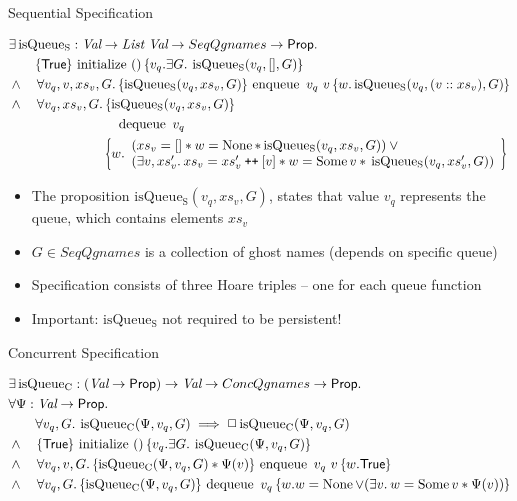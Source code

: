 \documentclass[9pt]{beamer}
\newcommand{\initialise}{\operatorname{initialize}}
\newcommand{\enqueue}{\operatorname{enqueue}}
\newcommand{\dequeue}{\operatorname{dequeue}}
\newcommand{\isqueueseq}{\operatorname{isQueue_{S}}}
\newcommand{\isqueueconc}{\operatorname{isQueue_{C}}}
\newcommand{\SeqQgnames}{SeqQgnames}
\newcommand{\ConcQgnames}{ConcQgnames}
\newcommand{\vq}{v_q}
\newcommand{\nodeval}{\valB}
\newcommand{\absvalue}{\val}
\newcommand{\absvalueList}{xs_v}
\newcommand{\Qg}{G}
\newcommand\catenate{\mathbin{\text{\ttfamily\upshape ++}}}
\newcommand{\seqspecinitHTGen}[2]{\hoare{\TRUE}{\initialise \ \TT}{#1 . \Exists #2. \isqueueseq(#1, [], #2)}}
\newcommand{\seqspecinitGen}[2]{\seqspecinitHTGen{#1}{#2}}
\newcommand{\seqspecinit}{\seqspecinitGen{\vq}{\Qg}}
\newcommand{\seqspecenqHT}[4]{\hoare{\isqueueseq(#1, #3, #4)}{\enqueue \ #1 \ #2}{\valB . \isqueueseq(#1, (#2 :: #3), #4)}}
\newcommand{\seqspecenqGen}[4]{\All #1, #2, #3, #4. \seqspecenqHT{#1}{#2}{#3}{#4}}
\newcommand{\seqspecenq}{\seqspecenqGen{\vq}{\absvalue}{\absvalueList}{\Qg}}
\newcommand{\seqspecdeqHT}[3]{\hoareV[t]{\isqueueseq(#1, #2, #3)}{\dequeue \ #1}{\nodeval . \begin{array}{l}(#2 = [] \star{} \nodeval = \None \star{} \isqueueseq(#1, #2, #3)) \lor{}\\ (\Exists \absvalue, #2' . #2 = #2' \catenate [\absvalue] \star{} \nodeval = \Some \absvalue \star{} \isqueueseq(#1, #2', #3)) \end{array}}}
\newcommand{\seqspecdeqGen}[3]{\All #1, #2, #3. \seqspecdeqHT{#1}{#2}{#3}}
\newcommand{\seqspecdeq}{\seqspecdeqGen{\vq}{\absvalueList}{\Qg}}
\newcommand{\concspecinitHTGen}[3]{\hoare{\TRUE}{\initialise \ \TT}{#2 . \Exists #3. \isqueueconc(#1, #2, #3)}}
\newcommand{\concspecinitGen}[3]{\concspecinitHTGen{#1}{#2}{#3}}
\newcommand{\concspecinit}[1]{\concspecinitGen{#1}{\vq}{\Qg}}
\newcommand{\concspecenqHT}[4]{\hoare{\isqueueconc(#1, #2, #4) \star{} #1(#3)}{\enqueue \ #2 \ #3}{\valB . \TRUE}}
\newcommand{\concspecenqGen}[4]{\All #2, #3, #4. \concspecenqHT{#1}{#2}{#3}{#4}}
\newcommand{\concspecenq}[1]{\concspecenqGen{#1}{\vq}{\absvalue}{\Qg}}
\newcommand{\concspecdeqHT}[3]{\hoare{\isqueueconc(#1, #2, #3)}{\dequeue \ #2}{\nodeval . \nodeval = \None \lor{} (\Exists \absvalue . \nodeval = \Some \absvalue \star{} #1(\absvalue))}}
\newcommand{\concspecdeqGen}[3]{\All #2, #3. \concspecdeqHT{#1}{#2}{#3}}
\newcommand{\concspecdeq}[1]{\concspecdeqGen{#1}{\vq}{\Qg}}
\begin{document}
\begin{frame}{Sequential Specification}
  \begin{definition}\label{QueueSpecs:spec:seq}
    \begin{align*}
      &\Exists \isqueueseq : \Val \to \List ~ \Val \to \SeqQgnames \to \Prop.\\
      &\quad\quad\seqspecinit\\
      &\land{}\quad\seqspecenq\\
      &\land{}\quad\seqspecdeq
    \end{align*}
  \end{definition}
  \begin{itemize}
    \item The proposition $\isqueueseq(\vq, \absvalueList, \Qg)$, states that value $\vq$ represents the queue, which contains elements $\absvalueList$
    \item $G \in \SeqQgnames{}$ is a collection of ghost names (depends on specific queue)
    \item Specification consists of three Hoare triples -- one for each queue function
    \item Important: $\isqueueseq$ not required to be persistent!
  \end{itemize}
\end{frame}

\begin{frame}{Concurrent Specification}
  \begin{definition}\label{QueueSpecs:spec:conc}
    \begin{align*}
      &\Exists \isqueueconc : (\Val \to \Prop) \to \Val \to \ConcQgnames \to \Prop.\\
      &\All \Psi : \Val \to \Prop.\\
      &\quad\quad \All \vq, \Qg . \isqueueconc(\Psi, \vq, \Qg) \implies \persistently \isqueueconc(\Psi, \vq, \Qg)\\
      &\land{}\quad\concspecinit{\Psi}\\
      &\land{}\quad\concspecenq{\Psi}\\
      &\land{}\quad\concspecdeq{\Psi}
    \end{align*}
  \end{definition}
\end{frame}
\end{document}

